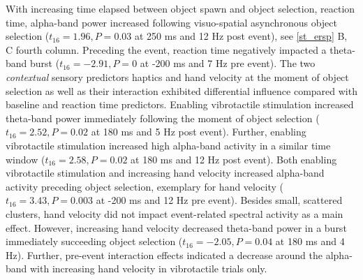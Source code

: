 With increasing time elapsed between object spawn and object selection, reaction time, alpha-band power increased following visuo-spatial asynchronous object selection ($t_{16} = 1.96, P = 0.03$ at 250 ms and 12 Hz post event), see \ref{st_ersp} B, C fourth column. Preceding the event, reaction time negatively impacted a theta-band burst ($t_{16} = -2.91, P = 0$ at -200 ms and 7 Hz pre event). The two \textit{contextual} sensory predictors haptics and hand velocity at the moment of object selection as well as their interaction exhibited differential influence compared with baseline and reaction time predictors. Enabling vibrotactile stimulation increased theta-band power immediately following the moment of object selection ($t_{16} = 2.52, P = 0.02$ at 180 ms and 5 Hz post event). Further, enabling vibrotactile stimulation increased high alpha-band activity in a similar time window ($t_{16} = 2.58, P = 0.02$ at 180 ms and 12 Hz post event). Both enabling vibrotactile stimulation and increasing hand velocity increased alpha-band activity preceding object selection, exemplary for hand velocity ($t_{16} = 3.43, P = 0.003$ at -200 ms and 12 Hz pre event). Besides small, scattered clusters, hand velocity did not impact event-related spectral activity as a main effect. However, increasing hand velocity decreased theta-band power in a burst immediately succeeding object selection ($t_{16} = -2.05, P = 0.04$ at 180 ms and 4 Hz). Further, pre-event interaction effects indicated a decrease around the alpha-band with increasing hand velocity in vibrotactile trials only.